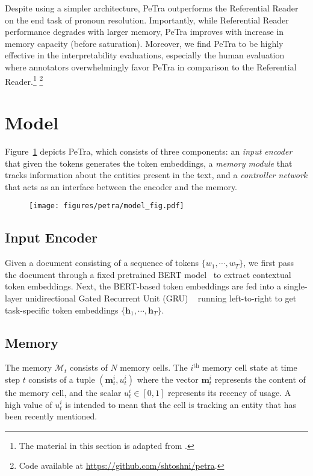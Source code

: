 \documentclass[12pt]{thesis-umich}[thesis]
\def\vec#1{\ensuremath{\boldsymbol{{#1}}}}
\begin{document}
Despite using  a simpler architecture, PeTra outperforms the Referential Reader on the end task of pronoun resolution.  
Importantly, while Referential Reader performance degrades with larger memory, PeTra improves with increase in memory capacity (before saturation).
Moreover,  we find PeTra to be highly effective in the interpretability evaluations, especially the human evaluation where annotators overwhelmingly favor PeTra in comparison to the Referential Reader.\footnote{The material in this section is adapted from \citet{toshniwal2020petra}.}
\footnote{Code available at \url{https://github.com/shtoshni/petra}.}



\section{Model}


Figure~\ref{fig:model_sch} depicts PeTra, which
consists of three components: an {\it input encoder} that given the tokens generates the token embeddings, a {\it memory module} that tracks information about the entities present in the text, and a {\it controller network} that acts as an interface between the encoder and the memory.
\begin{figure}[th]
	\centering
	\texttt{[image: figures/petra/model\_fig.pdf]}
	\label{fig:model_sch}
\end{figure}


\subsection{Input Encoder}
\label{sec:input_encoder}
Given a document consisting of a sequence of tokens $\{w_1, \cdots, w_T\}$, we first pass the document through a fixed pretrained BERT model~\cite{devlin2019bert} to extract contextual token embeddings.
Next, the BERT-based token embeddings are fed into a single-layer unidirectional Gated Recurrent Unit (GRU) ~\cite{cho2014learning} running left-to-right to get task-specific token embeddings $\{\vec{h}_1, \cdots, \vec{h}_T\}$.

\subsection{Memory}
The memory $\mathcal{M}_t$ consists of $N$ memory cells. The $i^{\textrm{th}}$ memory cell state at time step $t$ consists of a tuple $(\vec{m}^i_t, u^i_t)$
where the vector $\vec{m}^i_t$ represents the content of the memory cell, and the scalar $u^i_t \in [0, 1]$ represents
its recency of usage. A high value of $u^i_t$ is intended to mean that the cell is tracking an entity that has been recently mentioned. 
\end{document}
